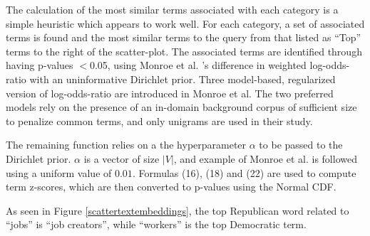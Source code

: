 \documentclass[11pt]{article}
\begin{document}
The calculation of the most similar terms associated with each category is a simple heuristic which appears to work well.  For each category, a set of associated terms is found and the most similar terms to the query from that listed as ``Top'' terms to the right of the scatter-plot.  The associated terms are identified through having p-values $<$0.05, using Monroe et al. 's difference in weighted log-odds-ratio with an uninformative Dirichlet prior.  Three model-based, regularized version of log-odds-ratio are introduced in Monroe et al.  The two preferred models rely on the presence of an in-domain background corpus of sufficient size to penalize common terms, and only unigrams are used in their study.  

The remaining function relies on a the hyperparameter \mbox{\boldmath$\alpha$} to be passed to the Dirichlet prior.  \mbox{\boldmath$\alpha$} is a vector of size $|V|$, and example of Monroe et al. is followed using a uniform value of $0.01$.  Formulas (16), (18) and (22) are used to compute term z-scores, which are then converted to p-values using the Normal CDF.

As seen in Figure \ref{scattertextembeddings}, the top Republican word related to ``jobs'' is ``job creators'', while ``workers'' is the top Democratic term.

\vspace{-0.3cm}
\nocite{ggplot2}
\nocite{Rudder2014}
\nocite{tidytext}


\end{document}
